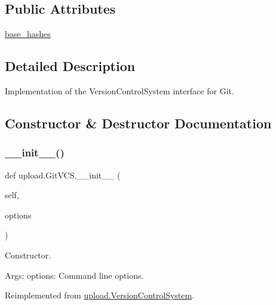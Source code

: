 \subsection*{Public Attributes}
\begin{DoxyCompactItemize}
\item 
\mbox{\hyperlink{classupload_1_1GitVCS_a07e9469050a157f34fe804cdf6ecddac}{base\+\_\+hashes}}
\end{DoxyCompactItemize}


\subsection{Detailed Description}
\begin{DoxyVerb}Implementation of the VersionControlSystem interface for Git.\end{DoxyVerb}
 

\subsection{Constructor \& Destructor Documentation}
\mbox{\label{classupload_1_1GitVCS_aba4e1dca1c4b3e5db7ba07f6bce3c839}} 
\subsubsection{\texorpdfstring{\_\_init\_\_()}{\_\_init\_\_()}\hspace{0.1cm}{\footnotesize\ttfamily [1/2]}}
{\footnotesize\ttfamily def upload.\+Git\+V\+C\+S.\+\_\+\+\_\+init\+\_\+\+\_\+ (\begin{DoxyParamCaption}\item[{}]{self,  }\item[{}]{options }\end{DoxyParamCaption})}

\begin{DoxyVerb}Constructor.

Args:
  options: Command line options.
\end{DoxyVerb}
 

Reimplemented from \mbox{\hyperlink{classupload_1_1VersionControlSystem_ace97e5785a2b40011404ae6fbb956ecf}{upload.\+Version\+Control\+System}}.

\mbox{\label{classupload_1_1GitVCS_aba4e1dca1c4b3e5db7ba07f6bce3c839}} 
